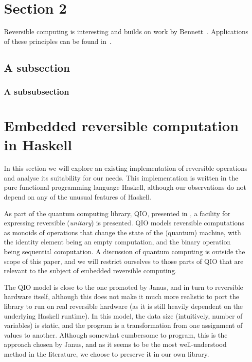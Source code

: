 \documentclass[10pt]{sigplanconf}
\begin{document}
\section{Section 2}
Reversible computing is interesting and builds on work by Bennett~\cite{Bennett:1982}. Applications of these principles can be found in~\cite{ThomsenAxelsen:2009:PPL,YokoyamaGlueck:2007:Janus}.

\subsection{A subsection}


\subsubsection{A subsubsection}

\section{Embedded reversible computation in Haskell}

In this section we will explore an existing implementation of
reversible operations and analyse its suitability for our needs.  This
implementation is written in the pure functional programming language
Haskell, although our observations do not depend on any of the unusual
features of Haskell.

As part of the quantum computing library, QIO, presented in
\cite{altenkirchquantum}, a facility for expressing reversible
(\textit{unitary}) is presented.  QIO models reversible computations
as monoids of operations that change the state of the (quantum)
machine, with the identity element being an empty computation, and the
binary operation being sequential computation.  A discussion of
quantum computing is outside the scope of this paper, and we will
restrict ourselves to those parts of QIO that are relevant to the
subject of embedded reversible computing.

The QIO model is close to the one promoted by Janus, and in turn to
reversible hardware itself, although this does not make it much more
realistic to port the library to run on real reversible hardware (as
it is still heavily dependent on the underlying Haskell runtime).  In
this model, the data size (intuitively, number of variables) is
static, and the program is a transformation from one assignment of
values to another.  Although somewhat cumbersome to program, this is
the approach chosen by Janus, and as it seems to be the most
well-understood method in the literature, we choose to preserve it in
our own library.
\end{document}
